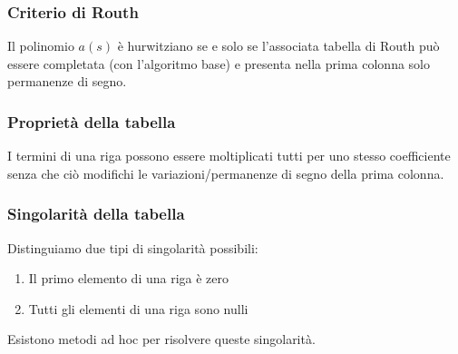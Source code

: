 \documentclass[11pt]{article}
\begin{document}
\subsubsection{Criterio di Routh}
Il polinomio $a(s)$ è hurwitziano se e solo se l'associata tabella di Routh può essere completata (con l'algoritmo base) e presenta nella prima colonna solo permanenze di segno. 
\subsubsection{Proprietà della tabella}
I termini di una riga possono essere moltiplicati tutti per uno stesso coefficiente senza che ciò modifichi le variazioni/permanenze di segno della prima colonna. 
\subsubsection{Singolarità della tabella}
Distinguiamo due tipi di singolarità possibili:
\begin{enumerate}
    \item Il primo elemento di una riga è zero 
    \item Tutti gli elementi di una riga sono nulli
\end{enumerate}
Esistono metodi ad hoc per risolvere queste singolarità. 
\end{document}
